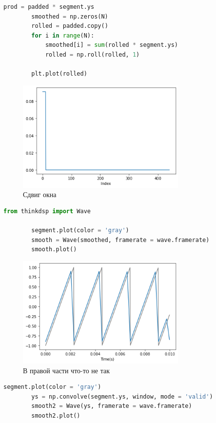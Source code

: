 \documentclass[a4paper, 12pt]{report}
\begin{document}
	\begin{lstlisting}[language=Python,caption=Сдвинули окно вправо]
		prod = padded * segment.ys
		smoothed = np.zeros(N)
		rolled = padded.copy()
		for i in range(N):
			smoothed[i] = sum(rolled * segment.ys)
			rolled = np.roll(rolled, 1)
		
		plt.plot(rolled)
	\end{lstlisting}
	\begin{figure}[H]
		\centering
		\includegraphics[width=0.75\textwidth]{test5.png}
		\caption{Сдвиг окна}
		\label{fig:test5}
	\end{figure}
	\begin{lstlisting}[language=Python,caption=Сравнение с исходным сигналом]
		from thinkdsp import Wave

		segment.plot(color = 'gray')
		smooth = Wave(smoothed, framerate = wave.framerate)
		smooth.plot()
	\end{lstlisting}
	\begin{figure}[H]
		\centering
		\includegraphics[width=0.75\textwidth]{test6.png}
		\caption{В правой части что-то не так}
		\label{fig:test6}
	\end{figure}
	\begin{lstlisting}[language=Python,caption=Встроенная функция свертки]
		segment.plot(color = 'gray')
		ys = np.convolve(segment.ys, window, mode = 'valid')
		smooth2 = Wave(ys, framerate = wave.framerate)
		smooth2.plot()
	\end{lstlisting}
\end{document}
